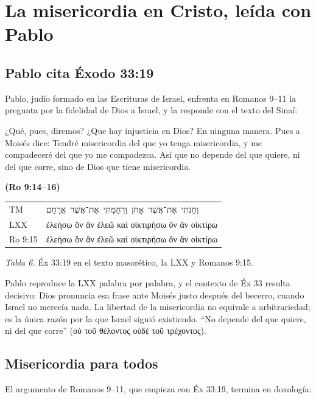 \documentclass[11pt,letterpaper]{article}
\newcommand{\heb}[1]{\mbox{\foreignlanguage{hebrew}{#1}}}
\newcommand{\grc}[1]{\foreignlanguage{ancientgreek}{#1}}
\newcommand{\fuente}[1]{\par\hfill{\upshape\bfseries\small\textcolor{azul}{#1}}}
\begin{document}
\section{La misericordia en Cristo, leída con Pablo}

\subsection{Pablo cita Éxodo 33:19}
Pablo, judío formado en las Escrituras de Israel, enfrenta en Romanos 9--11 la pregunta por la fidelidad de Dios a Israel, y la responde con el texto del Sinaí:

\begin{cita}¿Qué, pues, diremos? ¿Que hay injusticia en Dios? En ninguna manera. Pues a Moisés dice: Tendré misericordia del que yo tenga misericordia, y me compadeceré del que yo me compadezca. Así que no depende del que quiere, ni del que corre, sino de Dios que tiene misericordia.\fuente{(Ro 9:14--16)}\end{cita}

\begin{center}\small\renewcommand{\arraystretch}{1.25}
\begin{tabular}{@{}L{1.8cm}L{12.4cm}@{}}
\toprule
TM & \heb{וְחַנֹּתִי אֶת־אֲשֶׁר אָחֹן וְרִחַמְתִּי אֶת־אֲשֶׁר אֲרַחֵם} \\
LXX & \grc{ἐλεήσω ὃν ἂν ἐλεῶ καὶ οἰκτιρήσω ὃν ἂν οἰκτίρω} \\
Ro 9:15 & \grc{ἐλεήσω ὃν ἂν ἐλεῶ καὶ οἰκτιρήσω ὃν ἂν οἰκτίρω} \\
\bottomrule
\end{tabular}\par
{\footnotesize\color{gris}\textit{Tabla 6.} Éx 33:19 en el texto masorético, la LXX y Romanos 9:15.}
\end{center}

Pablo reproduce la LXX palabra por palabra, y el contexto de Éx 33 resulta decisivo: Dios pronuncia esa frase ante Moisés justo después del becerro, cuando Israel no merecía nada. La libertad de la misericordia no equivale a arbitrariedad; es la única razón por la que Israel siguió existiendo. ``No depende del que quiere, ni del que corre'' (\grc{οὐ τοῦ θέλοντος οὐδὲ τοῦ τρέχοντος}).

\subsection{Misericordia para todos}
El argumento de Romanos 9--11, que empieza con Éx 33:19, termina en doxología:
\end{document}

